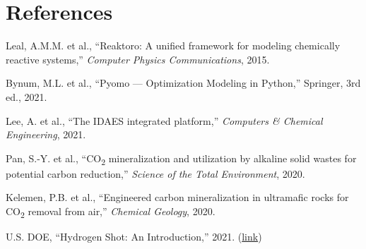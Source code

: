 \documentclass[11pt,a4paper]{article}
\begin{document}
\section*{References}

\begin{enumerate}[label={[\arabic*]}, noitemsep]
  \item Leal, A.M.M. et al., ``Reaktoro: A unified framework for modeling chemically reactive systems,'' \textit{Computer Physics Communications}, 2015.
  \item Bynum, M.L. et al., ``Pyomo --- Optimization Modeling in Python,'' Springer, 3rd ed., 2021.
  \item Lee, A. et al., ``The IDAES integrated platform,'' \textit{Computers \& Chemical Engineering}, 2021.
  \item Pan, S.-Y. et al., ``CO\textsubscript{2} mineralization and utilization by alkaline solid wastes for potential carbon reduction,'' \textit{Science of the Total Environment}, 2020.
  \item Kelemen, P.B. et al., ``Engineered carbon mineralization in ultramafic rocks for CO\textsubscript{2} removal from air,'' \textit{Chemical Geology}, 2020.
  \item U.S. DOE, ``Hydrogen Shot: An Introduction,'' 2021. (\href{https://www.energy.gov/eere/fuelcells/hydrogen-shot}{link})
\end{enumerate}
\end{document}
